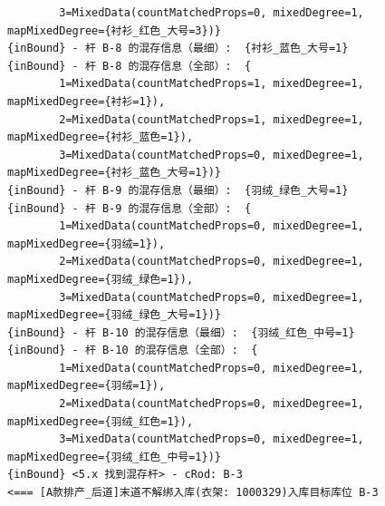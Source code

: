 {\begin{verbatim}
		3=MixedData(countMatchedProps=0, mixedDegree=1, mapMixedDegree={衬衫_红色_大号=3})}
{inBound} - 杆 B-8 的混存信息（最细）:  {衬衫_蓝色_大号=1}
{inBound} - 杆 B-8 的混存信息（全部）:  {
		1=MixedData(countMatchedProps=1, mixedDegree=1, mapMixedDegree={衬衫=1}), 
		2=MixedData(countMatchedProps=1, mixedDegree=1, mapMixedDegree={衬衫_蓝色=1}), 
		3=MixedData(countMatchedProps=0, mixedDegree=1, mapMixedDegree={衬衫_蓝色_大号=1})}
{inBound} - 杆 B-9 的混存信息（最细）:  {羽绒_绿色_大号=1}
{inBound} - 杆 B-9 的混存信息（全部）:  {
		1=MixedData(countMatchedProps=0, mixedDegree=1, mapMixedDegree={羽绒=1}), 
		2=MixedData(countMatchedProps=0, mixedDegree=1, mapMixedDegree={羽绒_绿色=1}), 
		3=MixedData(countMatchedProps=0, mixedDegree=1, mapMixedDegree={羽绒_绿色_大号=1})}
{inBound} - 杆 B-10 的混存信息（最细）:  {羽绒_红色_中号=1}
{inBound} - 杆 B-10 的混存信息（全部）:  {
		1=MixedData(countMatchedProps=0, mixedDegree=1, mapMixedDegree={羽绒=1}), 
		2=MixedData(countMatchedProps=0, mixedDegree=1, mapMixedDegree={羽绒_红色=1}), 
		3=MixedData(countMatchedProps=0, mixedDegree=1, mapMixedDegree={羽绒_红色_中号=1})}
{inBound} <5.x 找到混存杆> - cRod: B-3
<=== [A款排产_后道]末道不解绑入库(衣架: 1000329)入库目标库位 B-3


\end{verbatim}}
